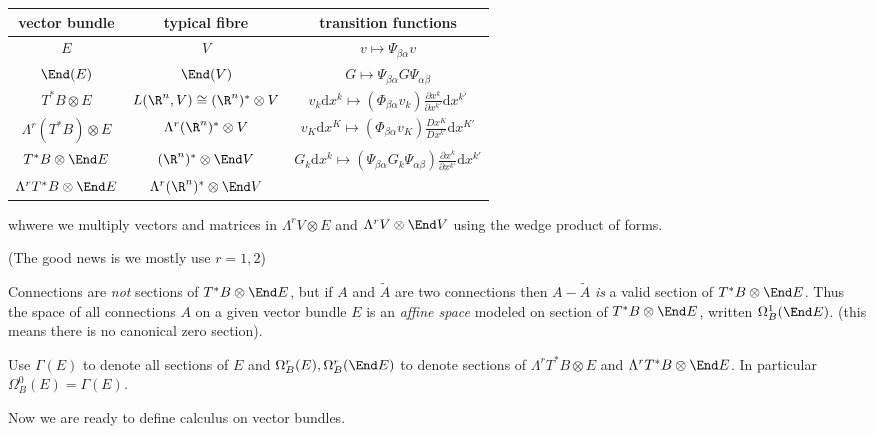 \documentclass[a4paper]{article}
\begin{document}
\begin{table}[h]
  \centering
  \begin{tabular}{|c|c|c|}
    \hline
    vector bundle & typical fibre & transition functions \\ \hline
    \(E\) & \(V\) & \(v \mapsto \Psi_{\beta\alpha}v\) \\ \hline
    \(\End(E)\) & \(\End(V)\) & \(G \mapsto \Psi_{\beta\alpha} G \Psi_{\alpha\beta}\) \\ \hline
    \(T^*B \otimes E\) & \(L(\R^n, V) \cong (\R^n)^* \otimes V\) & \(v_k \mathrm dx^k \mapsto (\Phi_{\beta\alpha} v_k) \frac{\partial x^k}{\partial x^{k'}} \mathrm d x^{k'}\) \\ \hline
    \(\Lambda^r(T^*B) \otimes E\) & \(\Lambda^r(\R^n)^* \otimes V\) & \(v_K \mathrm d x^K \mapsto (\Phi_{\beta\alpha}v_K) \frac{D x^K}{D x^{k'}} \mathrm dx^{K'}\) \\ \hline
    \(T^*B \otimes \End E\) & \((\R^n)^* \otimes \End V\) & \(G_k \mathrm dx^k \mapsto (\Psi_{\beta\alpha} G_k \Psi_{\alpha\beta}) \frac{\partial x^k}{\partial x^{k'}} \mathrm d x^{k'}\) \\ \hline
    \(\Lambda^rT^*B \otimes \End E\) & \(\Lambda^r(\R^n)^* \otimes \End V\) &  \\ \hline
  \end{tabular}
\end{table}

whwere we multiply vectors and matrices in \(\Lambda^r V \otimes E\) and \(\Lambda^r V \otimes \End V\) using the wedge product of forms.

(The good news is we mostly use \(r = 1, 2\))

Connections are \emph{not} sections of \(T^*B \otimes \End E\), but if \(A\) and \(\tilde A\) are two connections then \(A - \tilde A\) \emph{is} a valid section of \(T^*B \otimes \End E\). Thus the space of all connections \(A\) on a given vector bundle \(E\) is an \emph{affine space} modeled on  section of \(T^*B \otimes \End E\), written \(\Omega^1_B(\End E)\). (this means there is no canonical zero section).

\begin{notation}
  Use \(\Gamma(E)\) to denote all sections of \(E\) and \(\Omega^r_B(E), \Omega^r_B(\End E)\) to denote sections of \(\Lambda^r T^*B \otimes E\) and \(\Lambda^r T^*B \otimes \End E\). In particular \(\Omega^0_B(E) = \Gamma(E)\).
\end{notation}

Now we are ready to define calculus on vector bundles.
\end{document}
